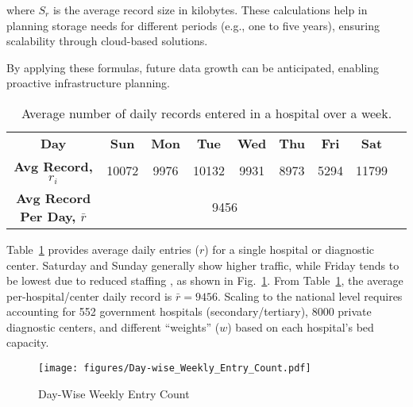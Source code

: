 where $S_r$ is the average record size in kilobytes. These calculations help in planning storage needs for different periods (e.g., one to five years), ensuring scalability through cloud-based solutions.

By applying these formulas, future data growth can be anticipated, enabling proactive infrastructure planning.




\begin{table}[!h]
    \centering
    \caption{Average number of daily records entered in a hospital over a week.}
    \label{tab:daily-avg-record}
    \setlength{\tabcolsep}{2pt}
    \begin{tabular}{c|cccccccc}
        \toprule
         \textbf{Day} &\textbf{Sun}& \textbf{Mon}& \textbf{Tue} &\textbf{Wed} &\textbf{Thu} &\textbf{Fri} &\textbf{Sat}  \\
         \textbf{Avg Record, \(r_i\)} &10072 &9976 &10132 &9931 &8973 &5294 &11799\\
         \midrule
        \textbf{Avg Record Per Day, \(\bar{r}\) } & \multicolumn{6}{c}{9456}\\
         \bottomrule
    \end{tabular}
\end{table}

Table~\ref{tab:daily-avg-record} provides average daily
entries (\(r\)) for a single hospital or diagnostic center. Saturday
and Sunday generally show higher traffic, while Friday tends
to be lowest due to reduced staffing , as shown in Fig.~\ref{fig:Day-wise Weekly Entry Count}. From Table~\ref{tab:daily-avg-record}, the average per-hospital/center daily record is \(\bar{r} = 9456\). Scaling to the national level requires accounting for 552 government hospitals (secondary/tertiary), 8000 private diagnostic centers, and different “weights” (\(w\)) based on each hospital’s bed capacity.
\begin{figure}[!h]
    \vspace{-3mm}
    \centering
    \texttt{[image: figures/Day-wise\_Weekly\_Entry\_Count.pdf]}
    \caption{Day-Wise Weekly Entry Count}
    \label{fig:Day-wise Weekly Entry Count}
\end{figure}




